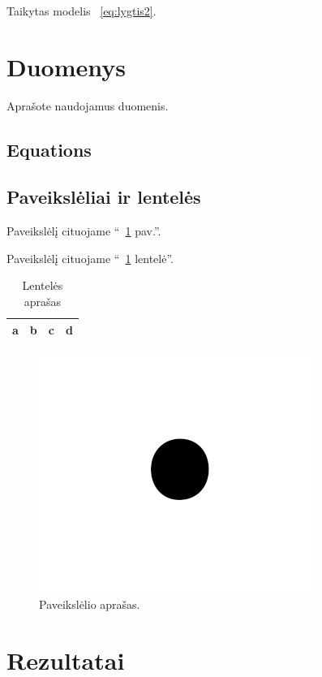 \documentclass[conference]{IEEEtran}
\begin{document}
Taikytas modelis ~\eqref{eq:lygtis2}.


\section{Duomenys}
Aprašote naudojamus duomenis.

\subsection{Equations}



\subsection{Paveikslėliai ir lentelės}

Paveikslėlį cituojame ``~\ref{fig} pav.''.

Paveikslėlį cituojame ``~\ref{tab1} lentelė''.

\begin{table}[htbp]
\caption{Lentelės aprašas}
\begin{center}
\begin{tabular}{|c|c|c|c|}
\hline
a & b & c &  d \\
\hline
\end{tabular}
\label{tab1}
\end{center}
\end{table}

\begin{figure}[!h] %
\centerline{\includegraphics{fig1.png}}
\caption{Paveikslėlio aprašas.}
\label{fig}
\end{figure}


\section{Rezultatai}
\end{document}
